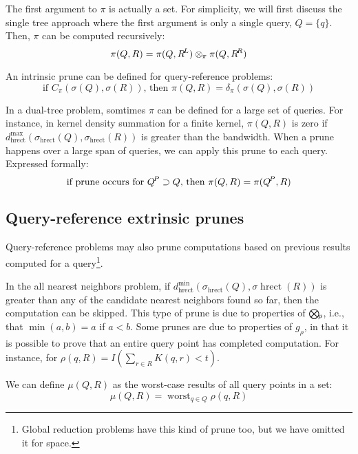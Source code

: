 \documentclass[times, 10pt,twocolumn]{article}
\DeclareMathOperator*{\worst}{worst}
\DeclareMathOperator{\hrect}{hrect}
\newcommand{\kdleft}{\hspace{-0.02in}^L}
\newcommand{\kdright}{\hspace{-0.02in}^R}
\newcommand{\kdparent}{\hspace{-0.02in}^P}
\newcommand{\myOp}[1]{\mathop{\bigotimes\nolimits\hspace{-0.045in}_{#1}}}
\newcommand{\myop}[1]{\otimes\hspace{-0.04in}_{#1}\hspace{0.03in}}
\newcommand{\allpi}{\pi}
\newcommand{\oppi}{\myop{\pi}}
\newcommand{\canprunepi}{C_{\pi}}
\newcommand{\deltapi}{\delta_{\pi}}
\newcommand{\allrho}{\rho}
\newcommand{\Oprho}{\myOp{\rho}}
\newcommand{\grho}{g_{\rho}}
\newcommand{\allmu}{\mu}
\newcommand{\allsigma}{\sigma}
\begin{document}
\noindent The first argument to $\allpi$ is actually a set.
For simplicity, we will first discuss the single tree approach where the first argument is only a single query, $Q = \{q\}$.
Then, $\allpi$ can be computed recursively:
\begin{equation}
\allpi(Q, R) = \allpi(Q, R\kdleft) \oppi \allpi(Q, R\kdright)
\label{eqn:dividepi}
\end{equation}

\noindent An intrinsic prune can be defined for query-reference problems:
\begin{equation}
\text{if } \canprunepi(\allsigma(Q), \allsigma(R)) \text{, then } \allpi(Q, R) = \deltapi(\allsigma(Q), \allsigma(R))
\label{eqn:prunepi}
\end{equation}

In a dual-tree problem, somtimes $\allpi$ can be defined for a large set of queries.
For instance, in kernel density summation for a finite kernel, $\allpi(Q, R)$ is zero if $d^{\max}_{\hrect}(\allsigma_{\hrect}(Q), \allsigma_{\hrect}(R))$ is greater than the bandwidth.
When a prune happens over a large span of queries, we can apply this prune to each query.
Expressed formally:
\begin{equation}
\text{if prune occurs for } Q\kdparent \supset Q \text{, then } \allpi(Q, R) = \allpi(Q\kdparent, R)
\label{eqn:parentpi}
\end{equation}

\subsection{Query-reference extrinsic prunes}

Query-reference problems may also prune computations based on previous results computed for a query\footnote{Global reduction problems have this kind of prune too, but we have omitted it for space.}.

In the all nearest neighbors problem, if $d^{\min}_{\hrect}(\allsigma_{\hrect}(Q), \allsigma{\hrect}(R))$ is greater than any of the candidate nearest neighbors found so far, then the computation can be skipped.
This type of prune is due to properties of $\Oprho$, i.e., that $\min(a, b) = a$ if $a < b$.
Some prunes are due to properties of $\grho$, in that it is possible to prove that an entire query point has completed computation.
For instance, for $\rho(q, R) = I(\sum_{r \in R} K(q, r) < t)$.

We can define $\allmu(Q, R)$ as the worst-case results of all query points in a set:
 \begin{equation}
\allmu(Q, R) = \worst_{q \in Q} \allrho(q, R)
\label{eqn:defmu}
\end{equation}
\end{document}
